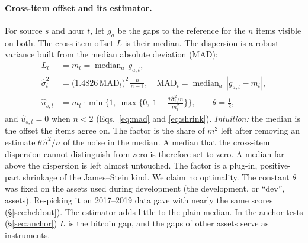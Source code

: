 \documentclass[sigconf,review,anonymous]{acmart}
\begin{document}
\paragraph{Cross-item offset and its estimator.} For source $s$ and hour $t$, let $g_a$ be the gaps to the reference
for the $n$ items visible on both. The cross-item offset $L$ is their median. The dispersion is a robust
variance built from the median absolute deviation (MAD):
\begin{align}
L_t &= m_t = \operatorname{median}_a\, g_{a,t}, \label{eq:median}\\
\hat\sigma^2_t &= \big(1.4826\,\mathrm{MAD}_t\big)^2\,\frac{n}{n-1},\quad
\mathrm{MAD}_t=\operatorname{median}_a\,|g_{a,t}-m_t|, \label{eq:mad}\\
\hat u_{s,t} &= m_t \cdot \min\!\Big\{1,\ \max\!\Big\{0,\ 1 - \frac{\theta\,\hat\sigma^2_t/n}{m_t^2}\Big\}\Big\},\qquad \theta=\tfrac12, \label{eq:shrink}
\end{align}
and $\hat u_{s,t}=0$ when $n<2$ (Eqs.~\eqref{eq:mad} and \eqref{eq:shrink}). \emph{Intuition:} the median is the offset the
items agree on. The factor is the share of $m^2$ left after removing an estimate $\theta\,\hat\sigma^2/n$ of the noise in the
median. A median that the cross-item dispersion cannot distinguish from zero is therefore set to zero. A median far above
the dispersion is left almost untouched. The factor is a plug-in, positive-part shrinkage of the James--Stein kind. We claim
no optimality. The constant $\theta$ was fixed on
the assets used during development (the development, or ``dev'', assets). Re-picking it on 2017--2019 data gave
\NumRHonestChosen{} with nearly the same scores (\S\ref{sec:heldout}). The estimator adds little to the plain median. In the anchor tests (\S\ref{sec:anchor}) $L$ is the bitcoin gap, and the gaps of other assets serve as
instruments.
\end{document}
